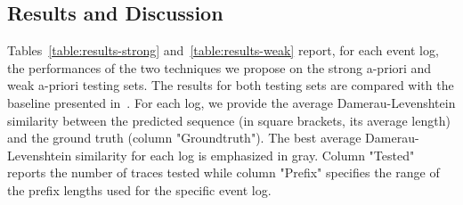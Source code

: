 
\subsection{Results and Discussion}
\label{ssec:results}

Tables~\ref{table:results-strong} and~\ref{table:results-weak} report, for each event log, the performances of the two techniques we propose on the strong a-priori and weak a-priori testing sets. The results for both testing sets are compared with the baseline presented in~\cite{niek96732}. For each log, we provide the average Damerau-Levenshtein similarity between the predicted sequence (in square brackets, its average length) and the ground truth (column "Groundtruth"). The best average Damerau-Levenshtein similarity for each log is emphasized in gray. Column "Tested" reports the number of traces tested while column "Prefix" specifies the range of the prefix lengths used for the specific event log. %

\newcommand{\maxf}[1]{{\cellcolor[gray]{0.8}} #1}

